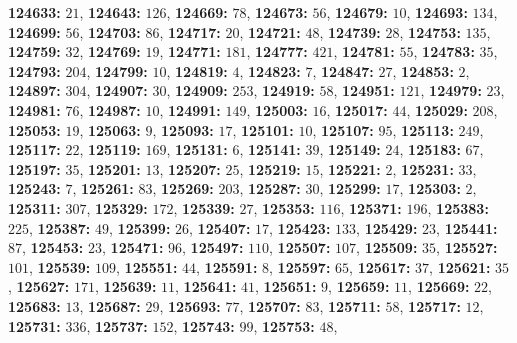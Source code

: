 \textsf{\bfseries 124633:} $21$, \textsf{\bfseries 124643:} $126$, \textsf{\bfseries 124669:} $78$, \textsf{\bfseries 124673:} $56$, \textsf{\bfseries 124679:} $10$, \textsf{\bfseries 124693:} $134$, \textsf{\bfseries 124699:} $56$, \textsf{\bfseries 124703:} $86$, \textsf{\bfseries 124717:} $20$, \textsf{\bfseries 124721:} $48$, \textsf{\bfseries 124739:} $28$, \textsf{\bfseries 124753:} $135$, \textsf{\bfseries 124759:} $32$, \textsf{\bfseries 124769:} $19$, \textsf{\bfseries 124771:} $181$, \textsf{\bfseries 124777:} $421$, \textsf{\bfseries 124781:} $55$, \textsf{\bfseries 124783:} $35$, \textsf{\bfseries 124793:} $204$, \textsf{\bfseries 124799:} $10$, \textsf{\bfseries 124819:} $4$, \textsf{\bfseries 124823:} $7$, \textsf{\bfseries 124847:} $27$, \textsf{\bfseries 124853:} $2$, \textsf{\bfseries 124897:} $304$, \textsf{\bfseries 124907:} $30$, \textsf{\bfseries 124909:} $253$, \textsf{\bfseries 124919:} $58$, \textsf{\bfseries 124951:} $121$, \textsf{\bfseries 124979:} $23$, \textsf{\bfseries 124981:} $76$, \textsf{\bfseries 124987:} $10$, \textsf{\bfseries 124991:} $149$, \textsf{\bfseries 125003:} $16$, \textsf{\bfseries 125017:} $44$, \textsf{\bfseries 125029:} $208$, \textsf{\bfseries 125053:} $19$, \textsf{\bfseries 125063:} $9$, \textsf{\bfseries 125093:} $17$, \textsf{\bfseries 125101:} $10$, \textsf{\bfseries 125107:} $95$, \textsf{\bfseries 125113:} $249$, \textsf{\bfseries 125117:} $22$, \textsf{\bfseries 125119:} $169$, \textsf{\bfseries 125131:} $6$, \textsf{\bfseries 125141:} $39$, \textsf{\bfseries 125149:} $24$, \textsf{\bfseries 125183:} $67$, \textsf{\bfseries 125197:} $35$, \textsf{\bfseries 125201:} $13$, \textsf{\bfseries 125207:} $25$, \textsf{\bfseries 125219:} $15$, \textsf{\bfseries 125221:} $2$, \textsf{\bfseries 125231:} $33$, \textsf{\bfseries 125243:} $7$, \textsf{\bfseries 125261:} $83$, \textsf{\bfseries 125269:} $203$, \textsf{\bfseries 125287:} $30$, \textsf{\bfseries 125299:} $17$, \textsf{\bfseries 125303:} $2$, \textsf{\bfseries 125311:} $307$, \textsf{\bfseries 125329:} $172$, \textsf{\bfseries 125339:} $27$, \textsf{\bfseries 125353:} $116$, \textsf{\bfseries 125371:} $196$, \textsf{\bfseries 125383:} $225$, \textsf{\bfseries 125387:} $49$, \textsf{\bfseries 125399:} $26$, \textsf{\bfseries 125407:} $17$, \textsf{\bfseries 125423:} $133$, \textsf{\bfseries 125429:} $23$, \textsf{\bfseries 125441:} $87$, \textsf{\bfseries 125453:} $23$, \textsf{\bfseries 125471:} $96$, \textsf{\bfseries 125497:} $110$, \textsf{\bfseries 125507:} $107$, \textsf{\bfseries 125509:} $35$, \textsf{\bfseries 125527:} $101$, \textsf{\bfseries 125539:} $109$, \textsf{\bfseries 125551:} $44$, \textsf{\bfseries 125591:} $8$, \textsf{\bfseries 125597:} $65$, \textsf{\bfseries 125617:} $37$, \textsf{\bfseries 125621:} $35$, \textsf{\bfseries 125627:} $171$, \textsf{\bfseries 125639:} $11$, \textsf{\bfseries 125641:} $41$, \textsf{\bfseries 125651:} $9$, \textsf{\bfseries 125659:} $11$, \textsf{\bfseries 125669:} $22$, \textsf{\bfseries 125683:} $13$, \textsf{\bfseries 125687:} $29$, \textsf{\bfseries 125693:} $77$, \textsf{\bfseries 125707:} $83$, \textsf{\bfseries 125711:} $58$, \textsf{\bfseries 125717:} $12$, \textsf{\bfseries 125731:} $336$, \textsf{\bfseries 125737:} $152$, \textsf{\bfseries 125743:} $99$, \textsf{\bfseries 125753:} $48$, 
